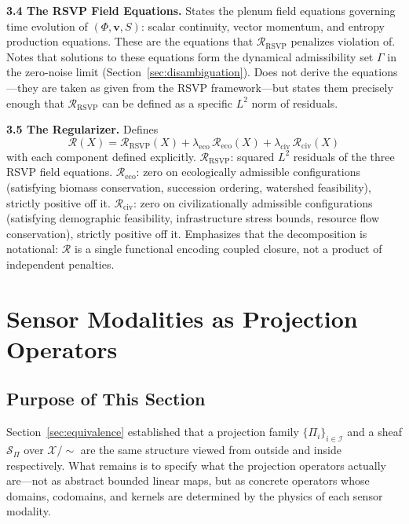\documentclass[12pt, oneside]{article}
\newcommand{\Xmod}{\mathcal{X}/{\sim}}
\begin{document}
{\medskip
\textbf{3.4 The RSVP Field Equations.}
States the plenum field equations governing time evolution of $(\Phi, \mathbf{v}, S)$:
scalar continuity, vector momentum, and entropy production equations. These are the
equations that $\mathcal{R}_{\mathrm{RSVP}}$ penalizes violation of. Notes that solutions
to these equations form the dynamical admissibility set $\Gamma$ in the zero-noise limit
(Section~\ref{sec:disambiguation}). Does not derive the equations---they are taken as
given from the RSVP framework---but states them precisely enough that $\mathcal{R}_{\mathrm{RSVP}}$
can be defined as a specific $L^2$ norm of residuals.

\medskip
\textbf{3.5 The Regularizer.}
Defines
\[
\mathcal{R}(X) = \mathcal{R}_{\mathrm{RSVP}}(X)
+ \lambda_{\mathrm{eco}}\,\mathcal{R}_{\mathrm{eco}}(X)
+ \lambda_{\mathrm{civ}}\,\mathcal{R}_{\mathrm{civ}}(X)
\]
with each component defined explicitly. $\mathcal{R}_{\mathrm{RSVP}}$: squared $L^2$
residuals of the three RSVP field equations. $\mathcal{R}_{\mathrm{eco}}$: zero on
ecologically admissible configurations (satisfying biomass conservation, succession
ordering, watershed feasibility), strictly positive off it. $\mathcal{R}_{\mathrm{civ}}$:
zero on civilizationally admissible configurations (satisfying demographic feasibility,
infrastructure stress bounds, resource flow conservation), strictly positive off it.
Emphasizes that the decomposition is notational: $\mathcal{R}$ is a single functional
encoding coupled closure, not a product of independent penalties.
}

\section{Sensor Modalities as Projection Operators}
\label{sec:projections}

\subsection{Purpose of This Section}

Section~\ref{sec:equivalence} established that a projection family $\{\Pi_i\}_{i \in \mathcal{I}}$
and a sheaf $\mathcal{S}_\Pi$ over $\Xmod$ are the same structure viewed from outside and
inside respectively. What remains is to specify what the projection operators actually
are---not as abstract bounded linear maps, but as concrete operators whose domains,
codomains, and kernels are determined by the physics of each sensor modality.
\end{document}
